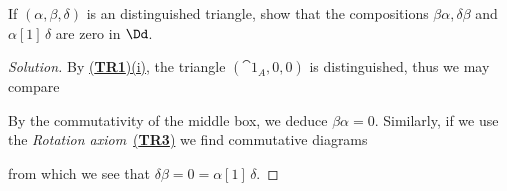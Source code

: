 \begin{exercise}
    If $(\alpha,\beta,\delta)$ is an distinguished triangle,
    show that the compositions $\beta\alpha, \delta\beta$ 
    and $\alpha[1]\,\delta$ are zero in $\Dd$.
    \begin{proof}[Solution]
        By \hyperref[TR1]{(\textbf{TR1})(i)}, 
        the triangle $(\cat{1}_{A},0,0)$ is distinguished,
        thus we may compare
        \begin{center}
        \end{center}
        By the commutativity of the middle box, we deduce $\beta\alpha=0$.
        Similarly, if we use the \emph{Rotation axiom}~\hyperref[TR2]{(\textbf{TR3})}
        we find commutative diagrams
        \begin{center}
        \end{center}
        from which we see that $\delta\beta = 0 = \alpha{[1]}\,\delta$.
    \end{proof}
\end{exercise}

